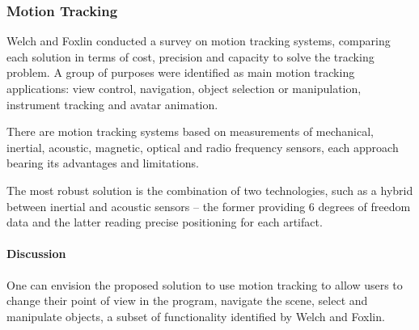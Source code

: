 




\subsubsection{Motion Tracking}

%
%


Welch and Foxlin \cite{MT-BULLET} conducted a survey on motion tracking systems, comparing
each solution in terms of cost, precision and capacity to solve the tracking problem.
A group of purposes were identified as main motion tracking applications:
view control, navigation, object selection or manipulation, instrument tracking and avatar animation.

There are motion tracking systems based on measurements of mechanical, inertial, acoustic, magnetic,
optical and radio frequency sensors, each approach bearing its advantages and limitations.

The most robust solution is the combination of two technologies, such as a hybrid between
inertial and acoustic sensors -- the former providing 6 degrees of freedom data and the latter
reading precise positioning for each artifact.


\paragraph{Discussion}

One can envision the proposed solution to use motion tracking to allow users to change their
point of view in the program, navigate the scene, select and manipulate objects, a subset
of functionality identified by Welch and Foxlin.

